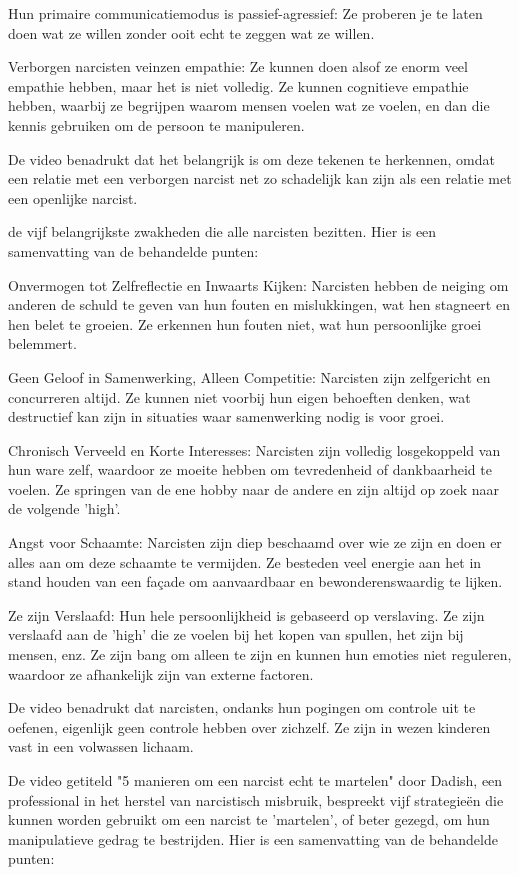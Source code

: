 Hun primaire communicatiemodus is passief-agressief: Ze proberen je te laten doen wat ze willen zonder ooit echt te zeggen wat ze willen.

Verborgen narcisten veinzen empathie: Ze kunnen doen alsof ze enorm veel empathie hebben, maar het is niet volledig. Ze kunnen cognitieve empathie hebben, waarbij ze begrijpen waarom mensen voelen wat ze voelen, en dan die kennis gebruiken om de persoon te manipuleren.

De video benadrukt dat het belangrijk is om deze tekenen te herkennen, omdat een relatie met een verborgen narcist net zo schadelijk kan zijn als een relatie met een openlijke narcist.

de vijf belangrijkste zwakheden die alle narcisten bezitten. Hier is een samenvatting van de behandelde punten:

Onvermogen tot Zelfreflectie en Inwaarts Kijken: Narcisten hebben de neiging om anderen de schuld te geven van hun fouten en mislukkingen, wat hen stagneert en hen belet te groeien. Ze erkennen hun fouten niet, wat hun persoonlijke groei belemmert.

Geen Geloof in Samenwerking, Alleen Competitie: Narcisten zijn zelfgericht en concurreren altijd. Ze kunnen niet voorbij hun eigen behoeften denken, wat destructief kan zijn in situaties waar samenwerking nodig is voor groei.

Chronisch Verveeld en Korte Interesses: Narcisten zijn volledig losgekoppeld van hun ware zelf, waardoor ze moeite hebben om tevredenheid of dankbaarheid te voelen. Ze springen van de ene hobby naar de andere en zijn altijd op zoek naar de volgende 'high'.

Angst voor Schaamte: Narcisten zijn diep beschaamd over wie ze zijn en doen er alles aan om deze schaamte te vermijden. Ze besteden veel energie aan het in stand houden van een façade om aanvaardbaar en bewonderenswaardig te lijken.

Ze zijn Verslaafd: Hun hele persoonlijkheid is gebaseerd op verslaving. Ze zijn verslaafd aan de 'high' die ze voelen bij het kopen van spullen, het zijn bij mensen, enz. Ze zijn bang om alleen te zijn en kunnen hun emoties niet reguleren, waardoor ze afhankelijk zijn van externe factoren.

De video benadrukt dat narcisten, ondanks hun pogingen om controle uit te oefenen, eigenlijk geen controle hebben over zichzelf. Ze zijn in wezen kinderen vast in een volwassen lichaam.

De video getiteld "5 manieren om een narcist echt te martelen" door Dadish, een professional in het herstel van narcistisch misbruik, bespreekt vijf strategieën die kunnen worden gebruikt om een narcist te 'martelen', of beter gezegd, om hun manipulatieve gedrag te bestrijden. Hier is een samenvatting van de behandelde punten:

